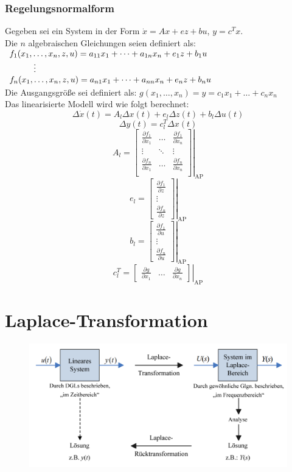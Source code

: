 \documentclass[10pt,a4paper]{article}
\newcommand{\tab}[1][1]{\hspace*{#1cm}}
\newcommand{\vect}[1]{\ensuremath{\begin{bmatrix}#1\end{bmatrix}}}
\begin{document}
\subsubsection{Regelungsnormalform}
Gegeben sei ein System in der Form $\dot x = Ax + ez + bu$, $y = c^T x$. \\
Die $n$ algebraischen Gleichungen seien definiert als: \\
$\begin{array}{l}
	f_1(x_1, \dots, x_n, z, u) = a_{11} x_1 + \dots + a_{1n} x_n + e_1 z + b_1 u \\
	\tab \vdots \\
	f_n(x_1, \dots, x_n, z, u) = a_{n1} x_1 + \dots + a_{nn} x_n + e_n z + b_n u
\end{array}$ \\
Die Ausgangsgröße sei definiert als:
$g(x_1, \dots, x_n) = y = c_1 x_1 + \dots + c_n x_n$ \\
Das linearisierte Modell wird wie folgt berechnet:
$$
	\Delta \dot x(t) = A_l \Delta x(t) + e_l \Delta z(t) + b_l \Delta u(t)
$$
$$
	\Delta y(t) = c_l^T \Delta x(t)
$$
$$
	A_l = \left. \begin{bmatrix}
		\frac{\partial f_1}{\partial x_1} & \dots & \frac{\partial f_1}{\partial x_n} \\
		\vdots & \ddots & \vdots \\
		\frac{\partial f_n}{\partial x_1} & \dots & \frac{\partial f_n}{\partial x_n} \\
	\end{bmatrix}\right |_\textrm{AP}
$$
$$
	e_l = \left.\vect{\frac{\partial f_1}{\partial z} \\ \vdots \\ \frac{\partial f_n}{\partial z}}\right |_\textrm{AP}
$$
$$
	b_l = \left.\vect{\frac{\partial f_1}{\partial u} \\ \vdots \\ \frac{\partial f_n}{\partial u}}\right |_\textrm{AP}
$$
$$
	c_l^T = \left.\vect{\frac{\partial g}{\partial x_1} & \dots & \frac{\partial g}{\partial x_n}}\right |_\textrm{AP}
$$

\section{Laplace-Transformation}
\begin{figure}[H]
	\includegraphics[width=0.8\columnwidth]{imgs/laplace.png}
\end{figure}
\end{document}
